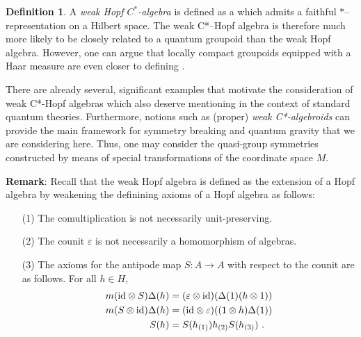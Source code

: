 \documentclass[12pt]{article}
\theoremstyle{plain}
\theoremstyle{definition}
\newtheorem{definition}{Definition}[section]
\numberwithin{equation}{section}
\newcommand{\ID}{{\rm id}}
\newcommand{\vep}{\varepsilon}
\newcommand{\med}{\medbreak}
\newcommand{\lra}{{\longrightarrow}}
\begin{document}
\begin{definition}  A {\em weak Hopf $C^*$-algebra} is defined as a  which admits a faithful $*$--representation on a Hilbert space. The weak C*--Hopf algebra is therefore much more likely to be closely related to a quantum groupoid than the weak Hopf algebra. However, one can argue that locally compact groupoids equipped with a Haar measure are even closer to defining . \end{definition}



There are already several, significant examples that motivate the consideration of weak C*-Hopf algebras which also deserve mentioning in the context of standard quantum theories. Furthermore, notions such as (proper) \emph{weak C*-algebroids} can provide the main framework for symmetry breaking and quantum gravity that we are considering here. Thus, one may consider the quasi-group symmetries constructed by means of special transformations of the coordinate space $M$.


\textbf{Remark}:
Recall that the weak Hopf algebra is defined as the extension of a Hopf algebra by weakening
the definining axioms of a Hopf algebra as follows:

\begin{itemize}
\item[(1)] The comultiplication is not necessarily unit-preserving.

\med
\item[(2)] The counit $\vep$ is not necessarily a homomorphism of algebras.

\med
\item[(3)] The axioms for the antipode map $S : A \lra A$ with respect to the
counit are as follows. For all $h \in H$,
\begin{equation}
\begin{aligned} m(\ID \otimes S) \Delta (h) &= (\vep \otimes
\ID)(\Delta (1) (h \otimes 1)) \\ m(S \otimes \ID) \Delta (h) &=
(\ID \otimes \vep)((1 \otimes h) \Delta(1)) \\ S(h) &= S(h_{(1)})
h_{(2)}  S(h_{(3)}) ~.
\end{aligned}
\end{equation}
\end{itemize}
\end{document}
